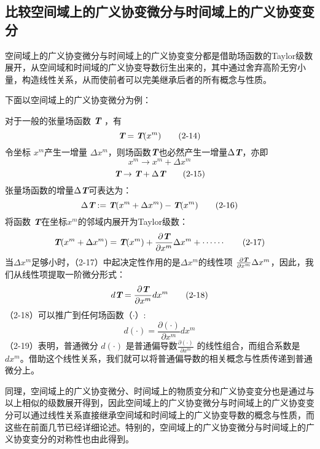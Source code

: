 \documentclass[UTF8]{ctexart}
\begin{document}
\subsection{比较空间域上的广义协变微分与时间域上的广义协变变分}
空间域上的广义协变微分与时间域上的广义协变变分都是借助场函数的Taylor级数展开，从空间域和时间域的广义协变导数衍生出来的，其中通过舍弃高阶无穷小量，构造线性关系，从而使前者可以完美继承后者的所有概念与性质。\par
下面以空间域上的广义协变微分为例：\par
对于一般的张量场函数 $ \textit{\textbf{T}} $ ，有
\begin{equation*}
    \textit{\textbf{T}}=\textit{\textbf{T}}(x^m)
    \tag{2-14}
\end{equation*}
令坐标 $x^m$产生一增量 $\Delta x^m$，则场函数$ \textit{\textbf{T}} $也必然产生一增量$\Delta \textit{\textbf{T}} $，亦即
\begin{equation*}
    x^m \rightarrow x^m + \Delta x^m
\end{equation*}
\begin{equation*}
    \textit{\textbf{T}} \rightarrow \textit{\textbf{T}} + \Delta \textit{\textbf{T}}
    \tag{2-15}
\end{equation*}
张量场函数的增量$\Delta \textit{\textbf{T}} $可表达为：
\begin{equation*}
    \Delta \textit{\textbf{T}} := \textit{\textbf{T}}(x^m + \Delta x^m) - \textit{\textbf{T}}(x^m)
    \tag{2-16}
\end{equation*}
将函数 $\textit{\textbf{T}}$在坐标$x^m$的邻域内展开为Taylor级数：
\begin{equation*}
    \textit{\textbf{T}}(x^m + \Delta x^m)=\textit{\textbf{T}}(x^m)+\frac{\partial \textit{\textbf{T}}}{\partial x^m}\Delta x^m+\cdots \cdots 
    \tag{2-17}
\end{equation*}
当$\Delta x^m$足够小时，（2-17）中起决定性作用的是$\Delta x^m$的线性项 $\frac{\partial \textit{\textbf{T}}}{\partial x^m}\Delta x^m$，因此，我们从线性项提取一阶微分形式：
\begin{equation*}
    d\textit{\textbf{T}}=\frac{\partial \textit{\textbf{T}}}{\partial x^m}d x^m
    \tag{2-18}
\end{equation*}
（2-18）可以推广到任何场函数（$\cdot$）:
\begin{equation*}
    d(\cdot)=\frac{\partial (\cdot)}{\partial x^m}d x^m
    \tag{2-19}
\end{equation*}
（2-19）表明，普通微分 $d(\cdot)$ 是普通偏导数$\frac{\partial (\cdot)}{\partial x^m}$ 的线性组合，而组合系数是$d x^m$。借助这个线性关系，我们就可以将普通偏导数的相关概念与性质传递到普通微分上。\par
同理，空间域上的广义协变微分、时间域上的物质变分和广义协变变分也是通过与以上相似的级数展开得到，因此空间域上的广义协变微分与时间域上的广义协变变分可以通过线性关系直接继承空间域和时间域上的广义协变导数的概念与性质，而这些在前面几节已经详细论述。特别的，空间域上的广义协变微分与时间域上的广义协变变分的对称性也由此得到。\par
\end{document}
